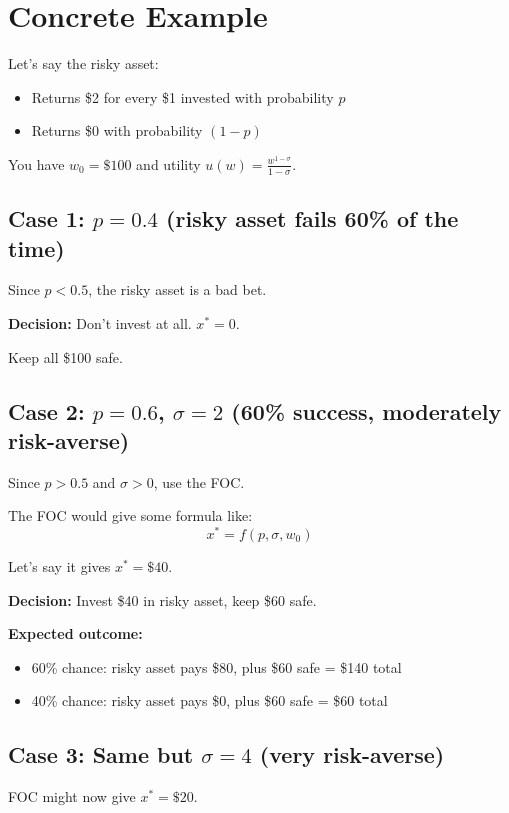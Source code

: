 \documentclass[12pt]{article}
\begin{document}
\newpage

\section*{Concrete Example}

Let's say the risky asset:
\begin{itemize}
\item Returns \$2 for every \$1 invested with probability $p$
\item Returns \$0 with probability $(1-p)$
\end{itemize}

You have $w_0 = \$100$ and utility $u(w) = \frac{w^{1-\sigma}}{1-\sigma}$.

\subsection*{Case 1: $p = 0.4$ (risky asset fails 60\% of the time)}

Since $p < 0.5$, the risky asset is a bad bet.

\textbf{Decision:} Don't invest at all. $x^* = 0$.

Keep all \$100 safe.

\subsection*{Case 2: $p = 0.6$, $\sigma = 2$ (60\% success, moderately risk-averse)}

Since $p > 0.5$ and $\sigma > 0$, use the FOC.

The FOC would give some formula like:
\[
x^* = f(p, \sigma, w_0)
\]

Let's say it gives $x^* = \$40$.

\textbf{Decision:} Invest \$40 in risky asset, keep \$60 safe.

\textbf{Expected outcome:}
\begin{itemize}
\item 60\% chance: risky asset pays \$80, plus \$60 safe = \$140 total
\item 40\% chance: risky asset pays \$0, plus \$60 safe = \$60 total
\end{itemize}

\subsection*{Case 3: Same but $\sigma = 4$ (very risk-averse)}

FOC might now give $x^* = \$20$.
\end{document}
